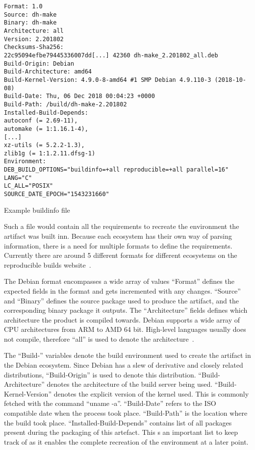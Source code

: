 \documentclass[../Main/thesis.tex]{subfiles}
\begin{document}
\begin{listing}[H]
\begin{verbatim}
Format: 1.0
Source: dh-make
Binary: dh-make
Architecture: all
Version: 2.201802
Checksums-Sha256:
22c95094efbe79445336007dd[...] 42360 dh-make_2.201802_all.deb
Build-Origin: Debian
Build-Architecture: amd64
Build-Kernel-Version: 4.9.0-8-amd64 #1 SMP Debian 4.9.110-3 (2018-10-08)
Build-Date: Thu, 06 Dec 2018 00:04:23 +0000
Build-Path: /build/dh-make-2.201802
Installed-Build-Depends:
autoconf (= 2.69-11),
automake (= 1:1.16.1-4),
[...]
xz-utils (= 5.2.2-1.3),
zlib1g (= 1:1.2.11.dfsg-1)
Environment:
DEB_BUILD_OPTIONS="buildinfo=+all reproducible=+all parallel=16"
LANG="C"
LC_ALL="POSIX"
SOURCE_DATE_EPOCH="1543231660"
\end{verbatim}
\caption{Example buildinfo file}
\label{lst:buildinfo}
\end{listing}

Such a file would contain all the requirements to recreate the environment the
artifact was built inn. Because each ecosystem has their own way of parsing
information, there is a need for multiple formats to define the requirements.
Currently there are around 5 different formats for different ecosystems on the
reproducible builds website~\cite{reproducible-builds-2019}.

The Debian format encompasses a wide array of values ``Format'' defines the
expected fields in the format and gets incremented with any changes.  ``Source''
and ``Binary'' defines the source package used to produce the artifact, and the
corresponding binary package it outputs. The ``Architecture'' fields defines
which architecture the product is compiled towards. Debian supports a wide array
of CPU architectures from ARM to AMD 64 bit. High-level languages usually does
not compile, therefore ``all'' is used to denote the
architecture~\cite{deb-buildinfo}.

The ``Build-'' variables denote the build environment used to create the
artifact in the Debian ecosystem. Since Debian has a slew of derivative and
closely related distributions, ``Build-Origin'' is used to denote this
distribution.  ``Build-Architecture'' denotes the architecture of the build
server being used.  ``Build-Kernel-Version'' denotes the explicit  version of
the kernel used. This is commonly fetched with the command ``uname -a''.
``Build-Date'' refers to the ISO compatible date when the process took place.
``Build-Path'' is the location where the build took place.
``Installed-Build-Depends'' contains list of all packages present during the
packaging of this artefact. This s an important list to keep track of as it
enables the complete recreation of the environment at a later point.
\end{document}
